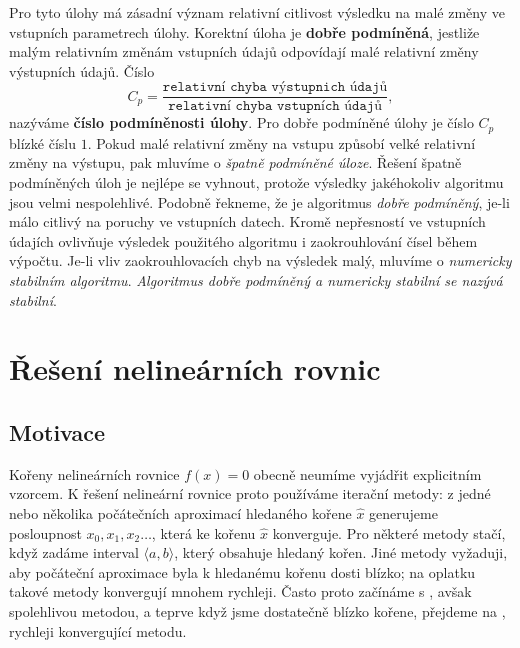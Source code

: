         Pro tyto úlohy má zásadní význam relativní citlivost výsledku na malé změny ve vstupních
        parametrech úlohy. Korektní úloha je \textbf{dobře pod\-mí\-ně\-ná}, jestliže malým
        relativním změnám vstupních údajů odpovídají malé relativní změny výstupních údajů. Číslo
        \begin{equation}\label{nm:eq_podminenost}
          C_p=\frac{\texttt{relativní chyba výstupnich údajů}}{\texttt{relativní chyba vstupních
              údajů}},
        \end{equation}
        nazýváme \textbf{číslo podmíněnosti úlohy}. Pro dobře podmíněné úlohy je číslo $C_p$ blízké
        číslu $1$. Pokud malé relativní změny na vstupu způsobí velké relativní změny na výstupu, 
        pak  mluvíme o \emph{špatně podmíněné úloze}. Řešení špatně podmíněných úloh je nejlépe se
        vyhnout, protože výsledky jakéhokoliv algoritmu jsou velmi nespolehlivé. Podobně řekneme, že
        je algoritmus \emph{dobře pod\-mí\-ně\-ný}, je-li málo citlivý na poruchy ve vstupních
        datech. Kromě ne\-přes\-ností ve vstupních údajích ovlivňuje výsledek použitého algoritmu i
        zaokrouhlování čísel během výpočtu. Je-li vliv zaokrouhlovacích chyb na výsledek malý,
        mluvíme o \emph{numericky stabilním algoritmu}. \emph{Algoritmus dobře pod\-mí\-ně\-ný a
        numericky stabilní se nazývá stabilní}.
  
  \section{Řešení nelineárních rovnic}
    \subsection{Motivace}
      Kořeny nelineárních rovnice $f(x)=0$ obecně neumíme vyjádřit explicitním vzorcem. K řešení
      nelineární rovnice proto používáme iterační metody: z jedné nebo několika počátečních
      aproximací hledaného kořene $\hat{x}$ generujeme posloupnost $x_0,x_1,x_2…$, která ke kořenu
      $\hat{x}$ konverguje. Pro některé metody stačí, když zadáme interval $\langle a,b\rangle$,
      který obsahuje hledaný kořen. Jiné metody vyžaduji, aby počáteční aproximace byla k hledanému
      kořenu dosti blízko; na oplatku takové metody konvergují mnohem rychleji. Často proto začínáme
      s , avšak spolehlivou metodou, a teprve když jsme dostatečně blízko kořene, 
      přejdeme na , rychleji konvergující metodu.
  

